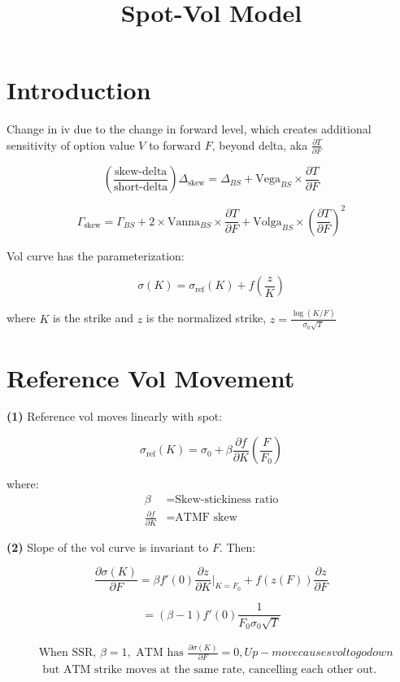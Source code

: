 \documentclass[12pt]{article}
\title{Spot-Vol Model}
\date{}
\begin{document}
\maketitle

\section{Introduction}

Change in iv due to the change in forward level, which creates additional sensitivity of option value $V$ to forward $F$, beyond delta, aka $\frac{\partial T}{\partial F}$

\[
\left(\frac{\text{skew-delta}}{\text{short-delta}}\right) \Delta_{\text{skew}} = \Delta_{BS} + \text{Vega}_{BS} \times \frac{\partial T}{\partial F}
\]

\[
\Gamma_{\text{skew}} = \Gamma_{BS} + 2 \times \text{Vanna}_{BS} \times \frac{\partial T}{\partial F} + \text{Volga}_{BS} \times \left(\frac{\partial T}{\partial F}\right)^2
\]

Vol curve has the parameterization:

\[
\sigma(K) = \sigma_{\text{ref}}(K) + f\left(\frac{z}{K}\right)
\]

where $K$ is the strike and $z$ is the normalized strike, $z = \frac{\log(K/F)}{\sigma_0\sqrt{T}}$

\section{Reference Vol Movement}

\textbf{(1)} Reference vol moves linearly with spot:

\[
\sigma_{\text{ref}}(K) = \sigma_0 + \beta \frac{\partial f}{\partial K} \left(\frac{F}{F_0}\right)
\]

where:
\begin{align}
\beta &= \text{Skew-stickiness ratio} \\
\frac{\partial f}{\partial K} &= \text{ATMF skew}
\end{align}

\textbf{(2)} Slope of the vol curve is invariant to $F$. Then:

\[
\frac{\partial \sigma(K)}{\partial F} = \beta f'(0) \frac{\partial z}{\partial K} \bigg|_{K=F_0} + f(z(F)) \frac{\partial z}{\partial F}
\]

\[
= (\beta-1) f'(0) \frac{1}{F_0\sigma_0\sqrt{T}}
\]

\begin{align*}
&\text{When SSR, } \beta = 1, \text{ ATM has } \frac{\partial \sigma(K)}{\partial F} = 0 , Up-move causes vol to go down\\
&\text{  but ATM strike moves at the same rate, cancelling each other out.}
\end{align*}
\end{document}
